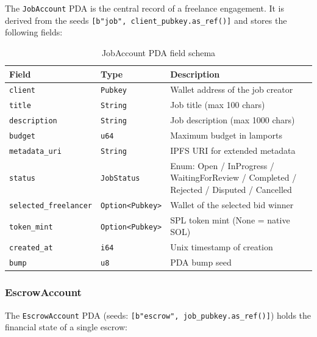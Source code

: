 The \texttt{JobAccount} PDA is the central record of a freelance engagement. It is derived from the seeds \texttt{[b"job", client\_pubkey.as\_ref()]} and stores the following fields:

\begin{table}[H]
\centering
\caption{JobAccount PDA field schema}
\label{table:job_account}
\begin{tabular}{|l|l|p{6cm}|}
\hline
\textbf{Field} & \textbf{Type} & \textbf{Description} \\ \hline
\texttt{client} & \texttt{Pubkey} & Wallet address of the job creator \\ \hline
\texttt{title} & \texttt{String} & Job title (max 100 chars) \\ \hline
\texttt{description} & \texttt{String} & Job description (max 1000 chars) \\ \hline
\texttt{budget} & \texttt{u64} & Maximum budget in lamports \\ \hline
\texttt{metadata\_uri} & \texttt{String} & IPFS URI for extended metadata \\ \hline
\texttt{status} & \texttt{JobStatus} & Enum: Open / InProgress / WaitingForReview / Completed / Rejected / Disputed / Cancelled \\ \hline
\texttt{selected\_freelancer} & \texttt{Option<Pubkey>} & Wallet of the selected bid winner \\ \hline
\texttt{token\_mint} & \texttt{Option<Pubkey>} & SPL token mint (None = native SOL) \\ \hline
\texttt{created\_at} & \texttt{i64} & Unix timestamp of creation \\ \hline
\texttt{bump} & \texttt{u8} & PDA bump seed \\ \hline
\end{tabular}
\end{table}

\subsubsection{EscrowAccount}

The \texttt{EscrowAccount} PDA (seeds: \texttt{[b"escrow", job\_pubkey.as\_ref()]}) holds the financial state of a single escrow:

